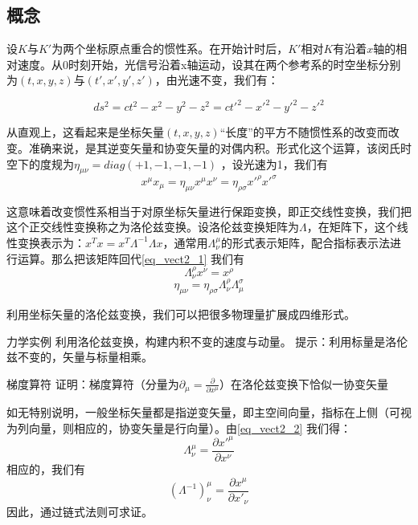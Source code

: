 \subsection{概念}
设$K$与$K'$为两个坐标原点重合的惯性系。在开始计时后，$K'$相对$K$有沿着$x$轴的相对速度。从$0$时刻开始，光信号沿着x轴运动，设其在两个参考系的时空坐标分别为$(t,x,y,z)$与$(t',x',y',z')$，由光速不变，我们有：

$$ds^2=ct^2-x^2-y^2-z^2=ct'^2-x'^2-y'^2-z'^2$$

从直观上，这看起来是坐标矢量$(t,x,y,z)$“长度”的平方不随惯性系的改变而改变。准确来说，是其逆变矢量和协变矢量的对偶内积。形式化这个运算，该闵氏时空下的度规为$\eta_{\mu\nu}=diag(+1,-1,-1,-1) $ ，设光速为1，我们有
\begin{equation}\label{eq_vect2_1}
x^\mu x_\mu =\eta_{\mu\nu}x^\mu x^\nu=\eta_{\rho \sigma}x'^\rho x'^\sigma   
\end{equation}

这意味着改变惯性系相当于对原坐标矢量进行保距变换，即正交线性变换，我们把这个正交线性变换称之为洛伦兹变换。设洛伦兹变换矩阵为$\Lambda$，在矩阵下，这个线性变换表示为：$x^T x=x^T\Lambda^{-1}\Lambda x$，通常用$\Lambda^\mu_\nu $的形式表示矩阵，配合指标表示法进行运算。那么把该矩阵回代\autoref{eq_vect2_1} 我们有
\begin{equation}\label{eq_vect2_2}
\Lambda^\rho_\nu x^\nu=x^\rho
\end{equation}
\begin{equation}
\eta_{\mu\nu}=\eta_{\rho \sigma}\Lambda^\rho_\nu \Lambda^\sigma_\mu 
\end{equation}

利用坐标矢量的洛伦兹变换，我们可以把很多物理量扩展成四维形式。
\begin{exercise}{力学实例}
利用洛伦兹变换，构建内积不变的速度与动量。
提示：利用标量是洛伦兹不变的，矢量与标量相乘。
\end{exercise}
\begin{exercise}{梯度算符}
证明：梯度算符（分量为$\partial_\mu=\frac{\partial}{\partial x^\mu}$）在洛伦兹变换下恰似一协变矢量

如无特别说明，一般坐标矢量都是指逆变矢量，即主空间向量，指标在上侧（可视为列向量，则相应的，协变矢量是行向量）。由\autoref{eq_vect2_2} 我们得：
\begin{equation}
\Lambda^\mu_\nu=\frac{\partial x'^\mu}{\partial x^\nu}
\end{equation}
相应的，我们有
\begin{equation}
(\Lambda^{-1})^\mu_\nu=\frac{\partial x^\mu }{\partial x'_\nu}
\end{equation}
因此，通过链式法则可求证。
\end{exercise}



